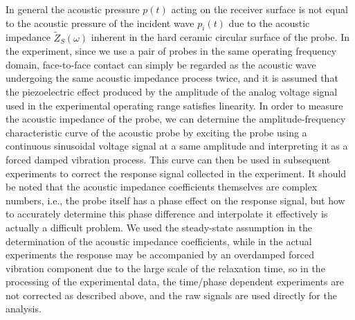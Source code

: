 \begin{digest}
    In general the acoustic pressure $p(t)$ acting on the receiver surface is not equal to the acoustic pressure of the incident wave $p_{i}(t)$ due to the acoustic impedance $\widetilde{Z}_{S}(\omega)$ inherent in the hard ceramic circular surface of the probe. 
    In the experiment, since we use a pair of probes in the same operating frequency domain, face-to-face contact can simply be regarded as the acoustic wave undergoing the same acoustic impedance process twice, and it is assumed that the piezoelectric effect produced by the amplitude of the analog voltage signal used in the experimental operating range satisfies linearity. 
    In order to measure the acoustic impedance of the probe, we can determine the amplitude-frequency characteristic curve of the acoustic probe by exciting the probe using a continuous sinusoidal voltage signal at a same amplitude and interpreting it as a forced damped vibration process. 
    This curve can then be used in subsequent experiments to correct the response signal collected in the experiment. It should be noted that the acoustic impedance coefficients themselves are complex numbers, i.e., the probe itself has a phase effect on the response signal, but how to accurately determine this phase difference and interpolate it effectively is actually a difficult problem. We used the steady-state assumption in the determination of the acoustic impedance coefficients, while in the actual experiments the response may be accompanied by an overdamped forced vibration component due to the large scale of the relaxation time, so in the processing of the experimental data, the time/phase dependent experiments are not corrected as described above, and the raw signals are used directly for the analysis.

    

\end{digest}
